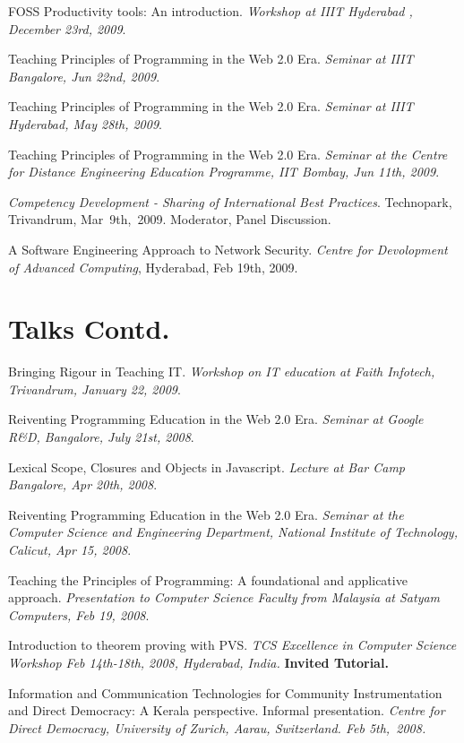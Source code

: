 \documentclass[11pt,margin,line]{res}
\begin{document}
\begin{resume}
FOSS Productivity tools: An introduction. {\em Workshop at IIIT
Hyderabad , December 23rd, 2009}.


Teaching Principles of Programming in the Web 2.0 Era. {\em
  Seminar at IIIT Bangalore, Jun 22nd, 2009}.

Teaching Principles of Programming in the Web 2.0 Era. {\em
  Seminar at IIIT Hyderabad, May 28th, 2009}.

Teaching Principles of Programming in the Web 2.0 Era. {\em
  Seminar at the Centre for Distance Engineering Education
  Programme, IIT Bombay, Jun 11th, 2009}.

{\em Competency Development - Sharing of International Best
  Practices}.  Technopark, Trivandrum, Mar~9th,~2009.
Moderator, Panel Discussion.

A Software Engineering Approach to Network Security.  {\em
  Centre for Devolopment of Advanced Computing}, Hyderabad,
Feb 19th, 2009.

\newpage

\section{\sc Talks Contd.}

Bringing Rigour in Teaching IT. {\em Workshop on IT
  education at Faith Infotech, Trivandrum, January 22,
  2009}.

Reiventing Programming Education in the Web 2.0 Era. {\em
  Seminar at Google R\&D, Bangalore, July 21st, 2008}.

Lexical Scope, Closures and Objects in Javascript. {\em
  Lecture at Bar Camp Bangalore, Apr 20th, 2008}.

Reiventing Programming Education in the Web 2.0 Era. {\em
  Seminar at the Computer Science and Engineering
  Department, National Institute of Technology, Calicut, Apr
  15, 2008}.

Teaching the Principles of Programming: A foundational and
applicative approach. {\em Presentation to Computer Science
  Faculty from Malaysia at Satyam Computers, Feb 19, 2008}.

Introduction to theorem proving with PVS. {\em TCS
  Excellence in Computer Science Workshop Feb 14th-18th,
  2008, Hyderabad, India.}  {\bf Invited Tutorial.}

Information and Communication Technologies for Community
Instrumentation and Direct Democracy: A Kerala perspective.
Informal presentation.  {\em Centre for Direct Democracy,
  University of Zurich, Aarau, Switzerland.  Feb 5th,~2008.}


\end{resume}
\end{document}
